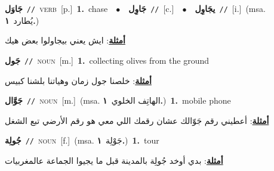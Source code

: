 \documentclass[10pt,a4paper,twoside]{article} %
\begin{document}
\begin{multicols}{2}
{\setlength\topsep{0pt}\textbf{\foreignlanguage{arabic}{جَاوَل}}\ {\color{gray}\texttt{//}\color{black}}\ \textsc{verb}\ [p.]\ \textbf{1.}~chase\ \ $\bullet$\ \ \setlength\topsep{0pt}\textbf{\foreignlanguage{arabic}{جَاوِل}}\ {\color{gray}\texttt{//}\color{black}}\ [c.]\ \ $\bullet$\ \ \setlength\topsep{0pt}\textbf{\foreignlanguage{arabic}{يجَاوِل}}\ {\color{gray}\texttt{//}\color{black}}\ [i.]\ \color{gray}(msa. \foreignlanguage{arabic}{يُطارد}~\foreignlanguage{arabic}{\textbf{١.}})\color{black}\  \begin{flushright}\color{gray}\foreignlanguage{arabic}{\textbf{\underline{\foreignlanguage{arabic}{أمثلة}}}: ايش يعني بيجاولوا بعض هيك}\end{flushright}\color{black}} \vspace{2mm}

{\setlength\topsep{0pt}\textbf{\foreignlanguage{arabic}{جَول}}\ {\color{gray}\texttt{//}\color{black}}\ \textsc{noun}\ [m.]\ \textbf{1.}~collecting olives from the ground\  \begin{flushright}\color{gray}\foreignlanguage{arabic}{\textbf{\underline{\foreignlanguage{arabic}{أمثلة}}}: خلصنا جول زمان وهياتنا بلشنا كبيس}\end{flushright}\color{black}} \vspace{2mm}

{\setlength\topsep{0pt}\textbf{\foreignlanguage{arabic}{جَوَّال}}\ {\color{gray}\texttt{//}\color{black}}\ \textsc{noun}\ [m.]\ \color{gray}(msa. \foreignlanguage{arabic}{الهاتِف الخلوي}~\foreignlanguage{arabic}{\textbf{١.}})\color{black}\ \textbf{1.}~mobile phone\  \begin{flushright}\color{gray}\foreignlanguage{arabic}{\textbf{\underline{\foreignlanguage{arabic}{أمثلة}}}: أعطيني رقم جَوّالك عشان رقمك اللي معي هو رقم الأرضي تبع الشغل}\end{flushright}\color{black}} \vspace{2mm}

{\setlength\topsep{0pt}\textbf{\foreignlanguage{arabic}{جُولِة}}\ {\color{gray}\texttt{//}\color{black}}\ \textsc{noun}\ [f.]\ \color{gray}(msa. \foreignlanguage{arabic}{جَوْلِة}~\foreignlanguage{arabic}{\textbf{١.}})\color{black}\ \textbf{1.}~tour\  \begin{flushright}\color{gray}\foreignlanguage{arabic}{\textbf{\underline{\foreignlanguage{arabic}{أمثلة}}}: بدي أوخد جُولِة بالمدينة قبل ما يجيوا الجماعة عالمغربيات}\end{flushright}\color{black}} \vspace{2mm}


\end{multicols}
\end{document}

